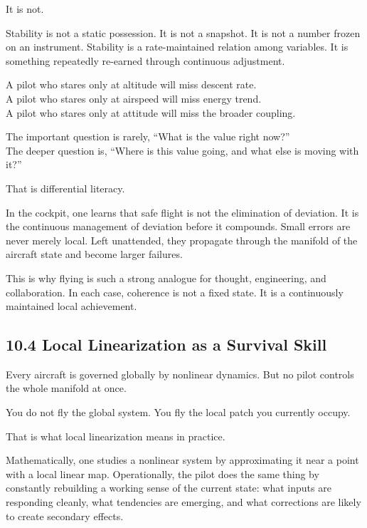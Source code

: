 \documentclass[
]{article}
\begin{document}
It is not.

Stability is not a static possession. It is not a snapshot. It is not a
number frozen on an instrument. Stability is a rate-maintained relation
among variables. It is something repeatedly re-earned through continuous
adjustment.

A pilot who stares only at altitude will miss descent rate.\\
A pilot who stares only at airspeed will miss energy trend.\\
A pilot who stares only at attitude will miss the broader coupling.

The important question is rarely, ``What is the value right now?''\\
The deeper question is, ``Where is this value going, and what else is
moving with it?''

That is differential literacy.

In the cockpit, one learns that safe flight is not the elimination of
deviation. It is the continuous management of deviation before it
compounds. Small errors are never merely local. Left unattended, they
propagate through the manifold of the aircraft state and become larger
failures.

This is why flying is such a strong analogue for thought, engineering,
and collaboration. In each case, coherence is not a fixed state. It is a
continuously maintained local achievement.

\hypertarget{local-linearization-as-a-survival-skill}{%
\subsection{10.4 Local Linearization as a Survival
Skill}\label{local-linearization-as-a-survival-skill}}

Every aircraft is governed globally by nonlinear dynamics. But no pilot
controls the whole manifold at once.

You do not fly the global system. You fly the local patch you currently
occupy.

That is what local linearization means in practice.

Mathematically, one studies a nonlinear system by approximating it near
a point with a local linear map. Operationally, the pilot does the same
thing by constantly rebuilding a working sense of the current state:
what inputs are responding cleanly, what tendencies are emerging, and
what corrections are likely to create secondary effects.
\end{document}
